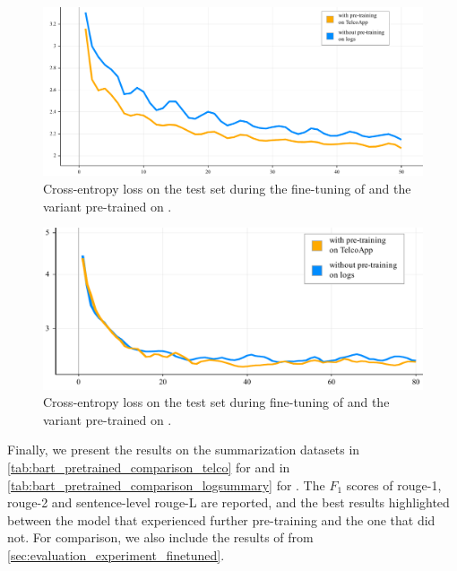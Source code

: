 \begin{figure}[htbp]
\centering
\includegraphics[width=.9\textwidth]{images/thesis/telcoapp_finetuning_loss}
\caption{Cross-entropy loss on the test set during the fine-tuning of  and the variant pre-trained on \telco{}.}
\label{fig:telco_finetuning_loss}
\end{figure}

\begin{figure}[htbp]
\centering
\includegraphics[width=.9\textwidth]{images/thesis/logsummary_finetuning_loss}
\caption{Cross-entropy loss on the test set during fine-tuning of  and the variant pre-trained on \logsummary{}.}
\label{fig:logsummary_finetuning_loss}
\end{figure}

Finally, we present the results on the summarization datasets
in \autoref{tab:bart_pretrained_comparison_telco} for \telco{}
and in \autoref{tab:bart_pretrained_comparison_logsummary} for \logsummary{}.
The \(F_1\) scores of \acs*{rouge}-1, \acs*{rouge}-2 and sentence-level \acs*{rouge}-L are reported,
and the best results highlighted between the model that experienced further pre-training and the one that did not.
For comparison, we also include the results of  from \autoref{sec:evaluation_experiment_finetuned}.

